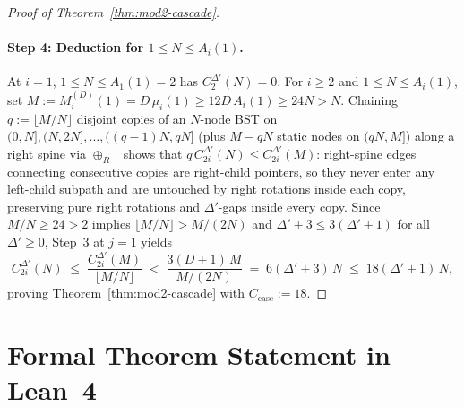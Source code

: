 \documentclass[11pt]{article}
\theoremstyle{definition}
\theoremstyle{remark}
\begin{document}
\begin{proof}[Proof of Theorem~\ref{thm:mod2-cascade}]
\paragraph{Step 4: Deduction for $1 \le N \le A_i(1)$.}
At $i = 1$, $1 \le N \le A_1(1) = 2$ has $C^{\Delta'}_2(N) = 0$. For $i \ge 2$ and $1 \le N \le A_i(1)$, set $M := M^{(D)}_i(1) = D\,\mu_i(1) \ge 12 D\,A_i(1) \ge 24 N > N$. Chaining $q := \lfloor M / N \rfloor$ disjoint copies of an $N$-node BST on $(0, N], (N, 2N], \dots, ((q - 1)N, qN]$ (plus $M - q N$ static nodes on $(qN, M]$) along a right spine via $\oplus_R$~\cite[Section~2.1, Lemma~1(c)]{Sundar1992} shows that $q\,C^{\Delta'}_{2i}(N) \le C^{\Delta'}_{2i}(M)$: right-spine edges connecting consecutive copies are right-child pointers, so they never enter any left-child subpath and are untouched by right rotations inside each copy, preserving pure right rotations and $\Delta'$-gaps inside every copy. Since $M / N \ge 24 > 2$ implies $\lfloor M / N \rfloor > M / (2N)$ and $\Delta' + 3 \le 3(\Delta' + 1)$ for all $\Delta' \ge 0$, Step~3 at $j = 1$ yields
\[
C^{\Delta'}_{2i}(N) \;\le\; \frac{C^{\Delta'}_{2i}(M)}{\lfloor M / N \rfloor} \;<\; \frac{3(D + 1)\,M}{M / (2N)} \;=\; 6(\Delta' + 3)\,N \;\le\; 18(\Delta' + 1)\,N,
\]
proving Theorem~\ref{thm:mod2-cascade} with $C_{\mathrm{casc}} := 18$.
\end{proof}


\section{Formal Theorem Statement in Lean~4}
\label{app:lean-statement}
\end{document}
